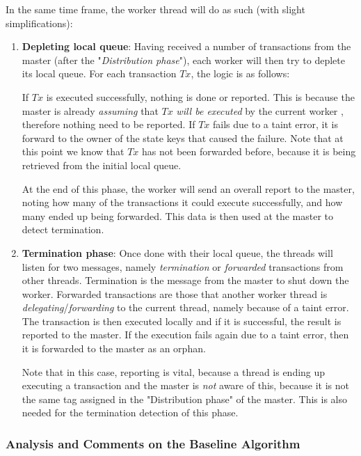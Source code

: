 In the same time frame, the worker thread will do as such (with slight simplifications):

\begin{enumerate}
	\item \textbf{Depleting local queue}: Having received a number of transactions from the master
	(after the "\textit{Distribution phase}"), each worker will then try to deplete its local queue.
	For each transaction $Tx$, the logic is as follows:

	If $Tx$ is executed successfully, nothing is done or reported. This is because the master is
	already \textit{assuming} that $Tx$ \textit{will be executed} by the current worker , therefore
	nothing need to be reported. If $Tx$ fails due to a taint error, it is forward to the owner of
	the state keys that caused the failure. Note that at this point we know that $Tx$ has not been
	forwarded before, because it is being retrieved from the initial local queue.

	At the end of this phase, the worker will send an overall report to the master, noting how many
	of the transactions it could execute successfully, and how many ended up being forwarded. This
	data is then used at the master to detect termination.

	\item \textbf{Termination phase}: Once done with their local queue, the threads will listen for
	two messages, namely \textit{termination} or \textit{forwarded} transactions from other threads.
	Termination is the message from the master to shut down the worker. Forwarded transactions are
	those that another worker thread is \textit{delegating}/\textit{forwarding} to the current
	thread, namely because of a taint error. The transaction is then executed locally and if it is
	successful, the result is reported to the master. If the execution fails again due to a taint
	error, then it is forwarded to the master as an orphan.

	Note that in this case, reporting is vital, because a thread is ending up executing a
	transaction and the master is \textit{not} aware of this, because it is not the same tag
	assigned in the "Distribution phase" of the master. This is also needed for the termination
	detection of this phase.
\end{enumerate}

\subsubsection{Analysis and Comments on the Baseline Algorithm}

